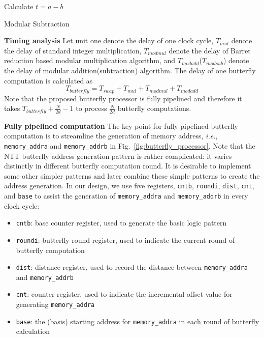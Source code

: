 \documentclass[submission]{iacrtrans}
\theoremstyle{plain}
\begin{document}
\begin{algorithm}[!tbh]
 \DontPrintSemicolon %
    Calculate $t=a-b$\;
     
    
 \caption{Modular Subtraction}\label{alg:modsub}
\end{algorithm}

\textbf{Timing analysis} Let  unit one denote the delay of one clock cycle, $T_{mul}$ denote the delay of standard integer multiplication, $T_{modmul}$ denote the delay of Barret reduction based modular multiplication algorithm, and $T_{modadd}$($T_{modsub}$) denote the delay of modular addition(subtraction) algorithm. The delay of one butterfly computation is calculated as
\[
    T_{butterfly} = T_{swap}+T_{mul}+T_{modmul}+T_{modadd}
\]
Note that the proposed butterfly processor is fully pipelined and therefore it takes $T_{butterfly}+\frac{N}{2d}-1$ to process $\frac{N}{2d}$ butterfly computations.

\textbf{Fully pipelined computation} The key point for fully pipelined butterfly computation is to streamline the generation of memory address, \textit{i.e.}, \texttt{memory\_addra} and \texttt{memory\_addrb} in Fig.~\ref{fig:butterfly_processor}. Note that the NTT butterfly address generation pattern is rather complicated: it varies distinctly in different butterfly computation round. It is desirable to implement some other simpler patterns and later combine these simple patterns to create the address generation.  In our design, we use five registers, \texttt{cntb}, \texttt{roundi}, \texttt{dist}, \texttt{cnt}, and \texttt{base} to assist the generation of \texttt{memory\_addra} and \texttt{memory\_addrb} in every clock cycle:

\begin{itemize}
    \item \texttt{cntb}: base counter register, used to generate the basic logic pattern
    \item \texttt{roundi}: butterfly round register, used to indicate the current round of butterfly computation
    \item \texttt{dist}: distance register, used to record the distance between \texttt{memory\_addra} and \texttt{memory\_addrb}
    \item \texttt{cnt}: counter register, used to indicate the incremental offset value for generating \texttt{memory\_addra}
    \item \texttt{base}: the (basis) starting address for \texttt{memory\_addra} in each round of butterfly calculation
\end{itemize}
\end{document}
